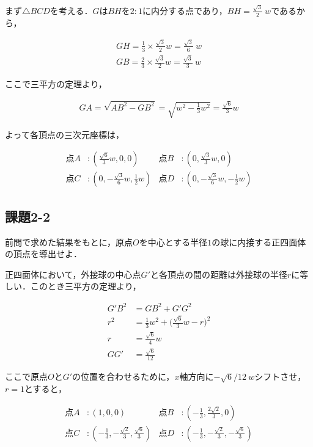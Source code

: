 \documentclass[twocolumn]{jsarticle}
\begin{document}
まず$\triangle{BCD}$を考える．$G$は$BH$を$2:1$に内分する点であり，$BH=\frac{\sqrt{3}}{2}\ w$であるから，

\begin{align*}
GH=\frac{1}{3}\times\frac{\sqrt{3}}{2} w=\frac{\sqrt{3}}{6}\ w\\
GB=\frac{2}{3}\times\frac{\sqrt{3}}{2} w=\frac{\sqrt{3}}{3}\ w
\end{align*}

ここで三平方の定理より，

\begin{align*}
GA=\sqrt{AB^2-GB^2}=\sqrt{w^2-\frac{1}{3}w^2}=\frac{\sqrt{6}}{3}w
\end{align*}

よって各頂点の三次元座標は，

\begin{align*}
点A&:\left(\frac{\sqrt{6}}{3}w, 0, 0\right)&点B&:\left(0, \frac{\sqrt{3}}{3}w, 0\right)\\
点C&:\left(0, -\frac{\sqrt{3}}{6}w, \frac{1}{2}w\right)&点D&:\left(0, -\frac{\sqrt{3}}{6}w, -\frac{1}{2}w\right)
\end{align*}

\subsection{課題2-2}
前問で求めた結果をもとに，原点$O$を中心とする半径$1$の球に内接する正四面体の頂点を導出せよ．

正四面体において，外接球の中心点$G'$と各頂点の間の距離は外接球の半径$r$に等しい．このとき三平方の定理より，

\begin{align*}
G'B^2&=GB^2+G'G^2\\
r^2&=\frac{1}{3}w^2+\bigg(\frac{\sqrt{6}}{3}w-r\bigg)^2\\
r&=\frac{\sqrt{6}}{4}w\\
GG'&=\frac{\sqrt{6}}{12}
\end{align*}

ここで原点$O$と$G'$の位置を合わせるために，$x$軸方向に$-\sqrt{6}/{12}\ w$シフトさせ，$r=1$とすると，

\begin{align*}
点A&:\left(1, 0, 0\right)&点B&:\left(-\frac{1}{3}, \frac{2\sqrt{2}}{3}, 0\right)\\
点C&:\left(-\frac{1}{3}, -\frac{\sqrt{2}}{3}, \frac{\sqrt{6}}{3}\right)&点D&:\left(-\frac{1}{3}, -\frac{\sqrt{2}}{3}, -\frac{\sqrt{6}}{3}\right)
\end{align*}
\end{document}
